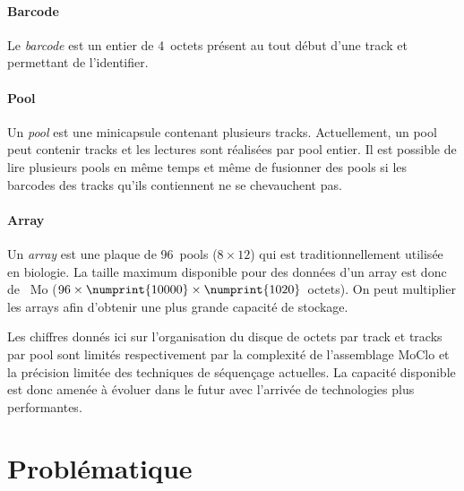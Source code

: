 \documentclass[a4paper]{report}
\begin{document}
\paragraph{Barcode} Le \emph{barcode} est un entier de 4~octets présent au tout début d'une track et permettant de l'identifier.

\paragraph{Pool} Un \emph{pool} est une minicapsule contenant plusieurs tracks.
Actuellement, un pool peut contenir  tracks et les lectures sont réalisées par pool entier.
Il est possible de lire plusieurs pools en même temps
et même de fusionner des pools si les barcodes des tracks qu'ils contiennent ne se chevauchent pas.

\paragraph{Array} Un \emph{array} est une plaque de 96~pools ($8\times12$) qui est traditionnellement utilisée en biologie.
La taille maximum disponible pour des données d’un array est donc de ~Mo ($96\times\numprint{10000}\times\numprint{1020}$~octets).
On peut multiplier les arrays afin d'obtenir une plus grande capacité de stockage.

Les chiffres donnés ici sur l’organisation du disque de  octets par track
et  tracks par pool sont limités respectivement par la complexité de l'assemblage MoClo
et la précision limitée des techniques de séquençage actuelles.
La capacité disponible est donc amenée à évoluer dans le futur avec l'arrivée de technologies plus performantes.


\section{Problématique}
\end{document}
